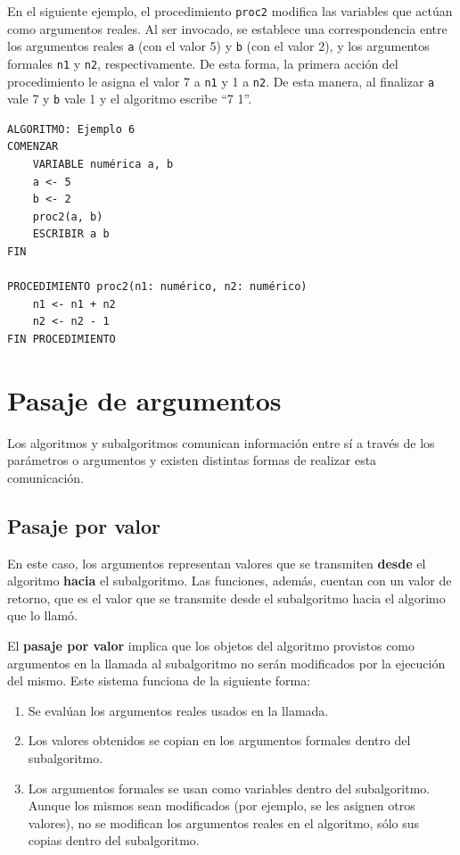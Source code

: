 \documentclass[]{book}
\providecommand{\tightlist}{%
  \setlength{\itemsep}{0pt}\setlength{\parskip}{0pt}}
\begin{document}
En el siguiente ejemplo, el procedimiento \texttt{proc2} modifica las
variables que actúan como argumentos reales. Al ser invocado, se
establece una correspondencia entre los argumentos reales \texttt{a}
(con el valor 5) y \texttt{b} (con el valor 2), y los argumentos
formales \texttt{n1} y \texttt{n2}, respectivamente. De esta forma, la
primera acción del procedimiento le asigna el valor 7 a \texttt{n1} y 1
a \texttt{n2}. De esta manera, al finalizar \texttt{a} vale 7 y
\texttt{b} vale 1 y el algoritmo escribe ``7 1''.

\begin{verbatim}
ALGORITMO: Ejemplo 6
COMENZAR
    VARIABLE numérica a, b
    a <- 5
    b <- 2
    proc2(a, b)
    ESCRIBIR a b
FIN

PROCEDIMIENTO proc2(n1: numérico, n2: numérico)
    n1 <- n1 + n2
    n2 <- n2 - 1
FIN PROCEDIMIENTO
\end{verbatim}

\section{Pasaje de argumentos}\label{pasaje-de-argumentos}

Los algoritmos y subalgoritmos comunican información entre sí a través
de los parámetros o argumentos y existen distintas formas de realizar
esta comunicación.

\subsection{Pasaje por valor}\label{pasaje-por-valor}

En este caso, los argumentos representan valores que se transmiten
\textbf{desde} el algoritmo \textbf{hacia} el subalgoritmo. Las
funciones, además, cuentan con un valor de retorno, que es el valor que
se transmite desde el subalgoritmo hacia el algorimo que lo llamó.

El \textbf{pasaje por valor} implica que los objetos del algoritmo
provistos como argumentos en la llamada al subalgoritmo no serán
modificados por la ejecución del mismo. Este sistema funciona de la
siguiente forma:

\begin{enumerate}
\def\labelenumi{\arabic{enumi}.}
\tightlist
\item
  Se evalúan los argumentos reales usados en la llamada.
\item
  Los valores obtenidos se copian en los argumentos formales dentro del
  subalgoritmo.
\item
  Los argumentos formales se usan como variables dentro del
  subalgoritmo. Aunque los mismos sean modificados (por ejemplo, se les
  asignen otros valores), no se modifican los argumentos reales en el
  algoritmo, sólo sus copias dentro del subalgoritmo.
\end{enumerate}
\end{document}
